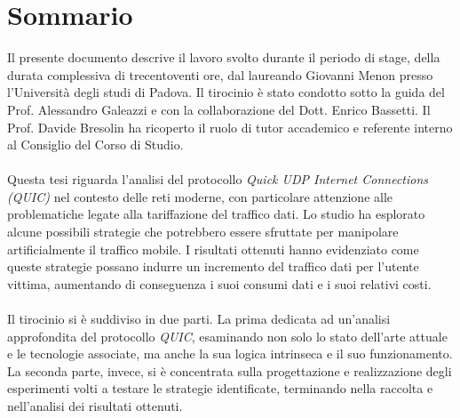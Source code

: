 \cleardoublepage
{}
{}
\begingroup
\let\clearpage\relax
\let\cleardoublepage\relax
\let\cleardoublepage\relax

\chapter*{Sommario}

Il presente documento descrive il lavoro svolto durante il periodo di stage, della durata complessiva di trecentoventi ore, dal laureando Giovanni Menon presso l'Università degli studi di Padova.
Il tirocinio è stato condotto sotto la guida del Prof. Alessandro Galeazzi e con la collaborazione del Dott. Enrico Bassetti.
Il Prof. Davide Bresolin ha ricoperto il ruolo di tutor accademico e referente interno al Consiglio del Corso di Studio.
\\\\
Questa tesi riguarda l'analisi del protocollo \emph{Quick UDP Internet Connections (QUIC)} nel contesto delle reti moderne, 
con particolare attenzione alle problematiche legate alla tariffazione del traffico dati. Lo studio ha esplorato alcune possibili strategie che potrebbero
essere sfruttate per manipolare artificialmente il traffico mobile. 
I risultati ottenuti hanno evidenziato come queste strategie possano indurre un incremento del traffico dati per l'utente vittima, 
aumentando di conseguenza i suoi consumi dati e i suoi relativi costi. 
\\\\
Il tirocinio si è suddiviso in due parti.
La prima dedicata ad un'analisi approfondita del protocollo \emph{QUIC}, esaminando non solo lo stato dell'arte attuale e le tecnologie associate, ma anche la sua logica intrinseca e il suo funzionamento.
La seconda parte, invece, si è concentrata sulla progettazione e realizzazione degli esperimenti volti a testare le strategie identificate, terminando nella raccolta e nell'analisi dei risultati ottenuti.



\endgroup

\vfill
